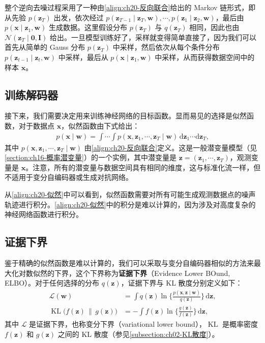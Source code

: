 \documentclass[../../main.tex]{subfiles}
\begin{document}
整个逆向去噪过程采用了一种由\eqref{align:ch20-反向联合}给出的 Markov 链形式，即从先验 $p(\bm{z}_T)$ 出发，依次经过 $p(\bm{z}_{T-1}\mid\bm{z}_T,\bm{w}),\cdots,p(\bm{z}_1\mid\bm{z}_2,\bm{w})$，最后由 $p(\bm{x}\mid\bm{z}_1,\bm{w})$ 生成数据。这里假设分布 $p(\bm{z}_T)$ 与 $q(\bm{z}_T)$ 相同，因此也由 $\mathcal{N}(\bm{z}_T\mid\bm{0},\bm{I})$ 给出。一旦模型训练好了，采样就变得简单直接了，因为我们可以首先从简单的 Gauss 分布 $p(\bm{z}_T)$ 中采样，然后依次从每个条件分布 $p(\bm{z}_{t-1}\mid\bm{z}_t,\bm{w})$ 中采样，最后从 $p(\bm{x}\mid\bm{z}_1,\bm{w})$ 中采样，从而获得数据空间中的样本 $\bm{x}$。

\subsection{训练解码器}\label{subsection:ch20-训练解码器}

接下来，我们需要决定用来训练神经网络的目标函数。显而易见的选择是似然函数，对于数据点 $\bm{x}$，似然函数由下式给出：
\begin{align}
p(\bm{x}\mid\bm{w})=\int\cdots\int p(\bm{x},\bm{z}_1,\cdots,\bm{z}_T\mid\bm{w})\,\mathrm{d}\bm{z}_1\cdots\mathrm{d}\bm{z}_T,
\label{align:ch20-似然}
\end{align}
其中 $p(\bm{x},\bm{z}_1,\cdots,\bm{z}_T\mid\bm{w})$ 由\eqref{align:ch20-反向联合}定义。这是一般潜变量模型（见\cref{section:ch16-概率潜变量}）的一个实例，其中潜变量是 $\bm{z}=(\bm{z}_1,\cdots,\bm{z}_T)$，观测变量是 $\bm{x}$。注意，所有的潜变量与数据空间具有相同的维度，这与标准化流一样，但不适用于变分自编码器或生成对抗网络。

从\eqref{align:ch20-似然}中可以看到，似然函数需要对所有可能生成观测数据点的噪声轨迹进行积分。\eqref{align:ch20-似然}中的积分是难以计算的，因为涉及对高度复杂的神经网络函数进行积分。

\subsection{证据下界}\label{subsection:ch20-证据下界}

鉴于精确的似然函数是难以计算的，我们可以采取与变分自编码器相似的方法来最大化对数似然的下界，这个下界称为\textbf{证据下界}（Evidence Lower BOund, ELBO）。对于任何选择的分布 $q(\bm{z})$，证据下界与 KL 散度分别定义如下：
\begin{align}
\mathcal{L}(\bm{w})&=\int q(\bm{z})\ln\Big\{\frac{p(\bm{x},\bm{z}\mid\bm{w})}{q(\bm{z})}\Big\}\,\mathrm{d}\bm{z},
\label{align:ch20-ELBO定义}\\
\operatorname{KL}\big(f(\bm{z})\,\|\,g(\bm{z})\big)&=-\int f(\bm{z})\ln\Big\{\frac{g(\bm{z})}{f(\bm{z})}\Big\}\,\mathrm{d}\bm{z},
\label{align:ch20-KL定义}
\end{align}
其中 $\mathcal{L}$ 是证据下界，也称变分下界（variational lower bound），$\operatorname{KL}$ 是概率密度 $f(\bm{z})$ 和 $g(\bm{z})$ 之间的 KL 散度（参见\cref{subsection:ch02-KL散度}）。
\end{document}

